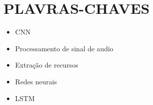 \documentclass{article}
\begin{document}
\section{PLAVRAS-CHAVES}
\begin{itemize}
    \item CNN
    \item Processamento de sinal de audio
    \item Extração de recursos
    \item Redes neurais
    \item LSTM
\end{itemize}
\end{document}
